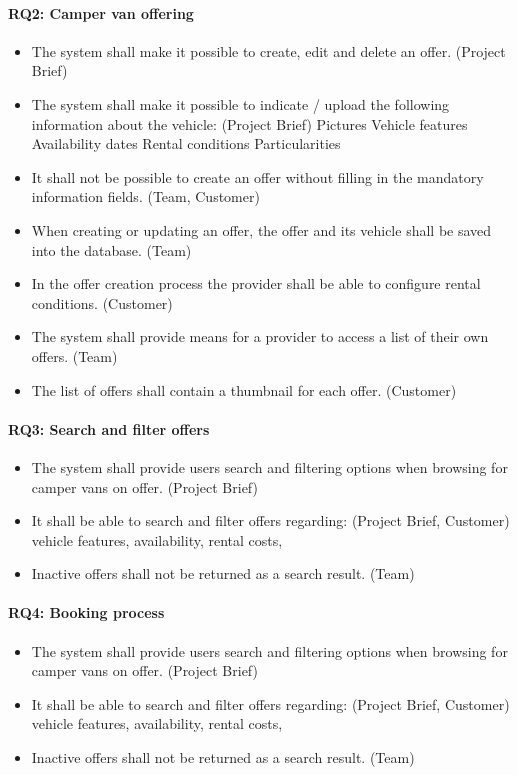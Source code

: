 \paragraph{RQ2: Camper van offering}
\begin{itemize}
    \item The system shall make it possible to create, edit and delete an offer. (Project Brief)
    \item The system shall make it possible to indicate / upload the following information about the vehicle: (Project Brief)
        \subitem Pictures
        \subitem Vehicle features
        \subitem Availability dates
        \subitem Rental conditions
        \subitem Particularities
    \item It shall not be possible to create an offer without filling in the mandatory information fields. (Team, Customer)
    \item When creating or updating an offer, the offer and its vehicle shall be saved into the database. (Team)
    \item In the offer creation process the provider shall be able to configure rental conditions. (Customer)
    \item The system shall provide means for a provider to access a list of their own offers. (Team)
    \item The list of offers shall contain a thumbnail for each offer. (Customer)
\end{itemize}

\paragraph{RQ3: Search and filter offers}
\begin{itemize}
    \item The system shall provide users search and filtering options when browsing for camper vans on offer. (Project Brief)
    \item It shall be able to search and filter offers regarding: (Project Brief, Customer)
        \subitem vehicle features,
        \subitem availability,
        \subitem rental costs,
    \item Inactive offers shall not be returned as a search result. (Team)
\end{itemize}

\paragraph{RQ4: Booking process}
\begin{itemize}
    \item The system shall provide users search and filtering options when browsing for camper vans on offer. (Project Brief)
    \item It shall be able to search and filter offers regarding: (Project Brief, Customer)
    \subitem vehicle features,
    \subitem availability,
    \subitem rental costs,
    \item Inactive offers shall not be returned as a search result. (Team)
\end{itemize}


